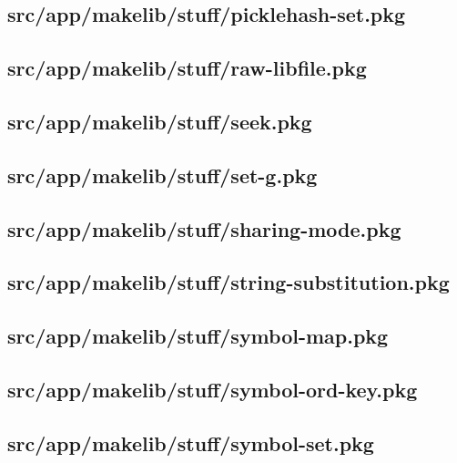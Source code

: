 \subsection{src/app/makelib/stuff/picklehash-set.pkg}


\subsection{src/app/makelib/stuff/raw-libfile.pkg}


\subsection{src/app/makelib/stuff/seek.pkg}


\subsection{src/app/makelib/stuff/set-g.pkg}


\subsection{src/app/makelib/stuff/sharing-mode.pkg}


\subsection{src/app/makelib/stuff/string-substitution.pkg}


\subsection{src/app/makelib/stuff/symbol-map.pkg}


\subsection{src/app/makelib/stuff/symbol-ord-key.pkg}


\subsection{src/app/makelib/stuff/symbol-set.pkg}


